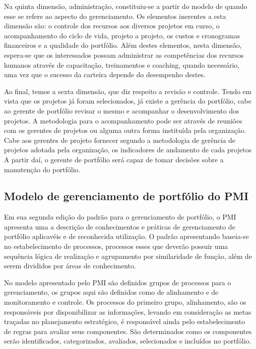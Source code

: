 \documentclass[a4paper,10pt]{article}
\begin{document}
\flushleft
Na quinta dimensão, administração, constituiu-se a partir do modelo de \cite{crawford} quando esse se refere ao
aspecto do gerenciamento. Os elementos inerentes a esta dimensão são: 
o controle dos recursos aos diversos projetos em curso, o acompanhamento do ciclo de vida, projeto
a projeto, os custos e cronogramas financeiros e a qualidade do portfólio. Além destes elementos, nesta dimensão,
espera-se que os interessados possam administrar as competências dos recursos humanos através de capacitação, 
treinamentos e coaching, quando necessário, uma vez que o sucesso da carteira depende do desempenho destes.

\flushleft
Ao final, temos a sexta dimensão, que diz respeito a revisão e controle. Tendo em vista que os projetos já foram selecionados,
já existe a gerência do portfólio, cabe ao gerente de portfólio revisar o mesmo e acompanhar o desenvolvimento dos projetos. A metodologia
para o acompanhamento pode ser através de reuniões com os gerentes de projetos ou alguma outra forma instituída pela organização. Cabe aos
gerentes de projeto fornecer segundo a metodologia de gerência de projetos adotada pela organização, os indicadores de andamento de cada projetos
A partir daí, o gerente de portfólio será capaz de tomar decisões sobre a manutenção do portfólio.

\subsection{Modelo de gerenciamento de portfólio do PMI}
\flushleft
Em sua segunda edição do padrão para o gerenciamento de portfólio, o PMI apresenta uma a descrição de conhecimentos e práticas de gerenciamento de portfólio
aplicavéis e de reconhecida utilização. O padrão apresentando baseia-se no estabelecimento de processos, processos esses que deverão possuir uma 
sequência lógica de realização e agrupamento  por similaridade de função, além de serem divididos por áreas de conhecimento. \cite{sppm}

\flushleft
No modelo apresentado pelo PMI são definidos grupos de processos para o gerenciamento, os grupos aqui são definidos como
de alinhamento e de monitoramento e controle. Os processos do primeiro grupo, alinhamento, são os responsáveis por disponibilizar as informações, 
levando em consideração as metas traçadas no planejamento estratégico, é responsável ainda pelo estabelecimento de regras para avaliar seus componentes. 
São determinados como os componentes serão identificados, categorizados, avaliados, selecionados e incluídos no portfólio.
\end{document}
